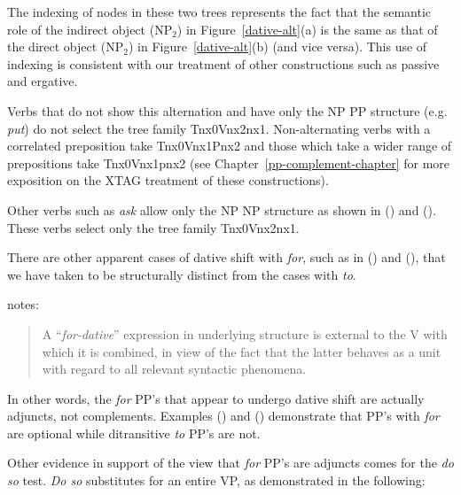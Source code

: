 The indexing of nodes in these two trees represents the fact that the semantic
role of the indirect object (NP$_2$) in Figure~\ref{dative-alt}(a) is the same
as that of the direct object (NP$_2$) in Figure~\ref{dative-alt}(b) (and vice
versa).  This use of indexing is consistent with our treatment of other
constructions such as passive and ergative.

Verbs that do not show this alternation and have only the NP PP
structure (e.g. {\it put\/}) do not select the tree family
Tnx0Vnx2nx1.  Non-alternating verbs with a correlated preposition take
Tnx0Vnx1Pnx2 and those which take a wider range of prepositions take
Tnx0Vnx1pnx2 (see Chapter~\ref{pp-complement-chapter} for more
exposition on the XTAG treatment of these constructions).  

Other verbs such as {\it ask} allow only the NP NP structure as shown
in () and ().  These verbs select only the tree family
Tnx0Vnx2nx1.


There are other apparent cases of dative shift with {\it for}, such as in
() and (), that we have taken to be structurally distinct from the
cases with {\it to}.


\cite{mccawley88} notes:

\begin{quote}
A ``{\it for-dative}'' expression in underlying structure is external
to the V with which it is combined, in view of the fact that the
latter behaves as a unit with regard to all relevant syntactic
phenomena.
\end{quote}


In other words, the {\it for} PP's that appear to undergo dative shift are
actually adjuncts, not complements. Examples () and () demonstrate
that PP's with {\it for} are optional while ditransitive {\it to} PP's are not.


Other evidence in support of the view that {\it for} PP's are adjuncts
comes for the {\it do so} test.  {\it Do so} substitutes for an entire
VP, as demonstrated in the following:


